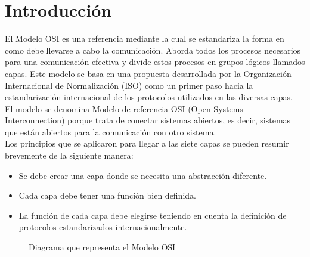 \section{Introducción}
El Modelo OSI es una referencia mediante la cual se estandariza la forma en como debe llevarse a cabo la comunicación. Aborda todos los procesos necesarios para una comunicación efectiva y divide estos procesos en grupos lógicos llamados capas.
Este modelo se basa en una propuesta desarrollada por la Organización Internacional de Normalización (ISO) como un primer paso hacia la estandarización internacional de los protocolos utilizados en las diversas capas.
\\${ }$\\
El modelo se denomina Modelo de referencia OSI (Open Systems Interconnection) porque trata de conectar sistemas abiertos, es decir, sistemas que están abiertos para la comunicación con otro sistema. 
\\ ${ }$\\
Los principios que se aplicaron para llegar a las siete capas se pueden resumir brevemente de la siguiente manera:
\begin{itemize}
\item Se debe crear una capa donde se necesita una abstracción diferente.
\item Cada capa debe tener una función bien definida.
\item La función de cada capa debe elegirse teniendo en cuenta la definición de protocolos estandarizados internacionalmente.
\end{itemize}


\begin{figure}[!ht]
\centering
{}
\caption{Diagrama que representa el Modelo OSI}
\end{figure}

